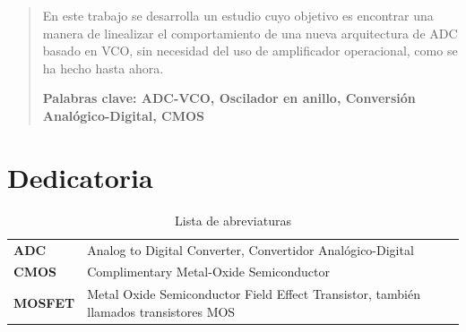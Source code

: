 \documentclass[12pt]{report} %
\begin{document}
\newpage %
\thispagestyle{empty}
\mbox{}

\renewcommand\abstractname{\large\bfseries\filcenter\uppercase{Resumen}}
\begin{abstract}
\thispagestyle{plain}
\setcounter{page}{3}
	
	En este trabajo se desarrolla un estudio cuyo objetivo es encontrar una manera de linealizar el comportamiento de una nueva arquitectura de ADC basado en VCO, sin necesidad del uso de amplificador operacional, como se ha hecho hasta ahora.
	
	\textbf{Palabras clave: ADC-VCO, Oscilador en anillo, Conversión Analógico-Digital, CMOS}
	
	\vfill
\end{abstract}
	\newpage %
	\thispagestyle{empty}
	\mbox{}


\chapter*{Dedicatoria}

\setcounter{page}{5}
	
		
	\vfill
	
	\newpage %
	\thispagestyle{empty}
	\mbox{}
	


\tableofcontents
\thispagestyle{fancy}


\listoffigures
\thispagestyle{fancy}


\listoftables
\thispagestyle{fancy}


\newpage
\begin{table}[h!]
	\setlength{\arrayrulewidth}{0mm}
	\begin{center}
		\caption{Lista de abreviaturas}
		\label{tab:table1}
		\begin{tabular}{>{\bf}p{4cm}|p{10cm}}
			ADC & Analog to Digital Converter, Convertidor Analógico-Digital \\
			CMOS & Complimentary Metal-Oxide Semiconductor \\
			MOSFET & Metal Oxide Semiconductor Field Effect Transistor, también llamados transistores MOS \\
		\end{tabular}
	\end{center}
\end{table}
\end{document}
